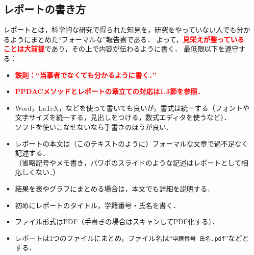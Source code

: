 \subsection{レポートの書き方}
%
レポートとは，科学的な研究で得られた知見を，研究をやっていない人でも分かるようにまとめた``フォーマルな''報告書である．
%
よって，\textcolor{red}{\textbf{見栄えが整っていることは大前提}}であり，その上で内容が伝わるように書く．
%
最低限以下を遵守する：
%
\begin{itemize}

\item
\textcolor{red}{\textbf{鉄則：``当事者でなくても分かるように書く．''}}

\item
\textcolor{red}{\textbf{PPDACメソッドとレポートの章立ての対応は1.3節を参照．}}

\item
Word，\LaTeX，などを使って書いても良いが，書式は統一する（フォントや文字サイズを統一する，見出しをつける，数式エディタを使うなど）．\\
ソフトを使いこなせないなら手書きのほうが良い．

\item
レポートの本文は（このテキストのように）フォーマルな文章で過不足なく記述する．\\
（省略記号やメモ書き，パワポのスライドのような記述はレポートとして相応しくない．）

\item
結果を表やグラフにまとめる場合は，本文でも詳細を説明する．

\item
初めにレポートのタイトル，学籍番号・氏名を書く．

\item
ファイル形式はPDF（手書きの場合はスキャンしてPDF化する）．

\item
レポートは1つのファイルにまとめ，ファイル名は``\verb|学籍番号_氏名.pdf|''などとする．


\end{itemize}


